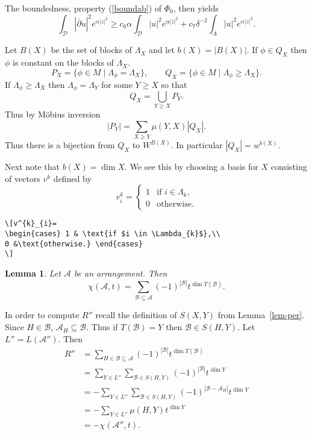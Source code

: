 \documentclass{article}
\newtheorem{lem}[thm]{Lemma}
\theoremstyle{definition}
\theoremstyle{remark}
\newcommand{\lemref}[1]{Lemma~\ref{#1}}
\newcommand{\A}{\mathcal{A}}
\newcommand{\B}{\mathcal{B}}
\newcommand{\envert}[1]{\left\lvert#1\right\rvert}
\let\abs=\envert
\begin{document}
The boundedness, property (\ref{boundab}) of $\Phi_ 0$, then yields
\[\int_{\mathcal{D}}\abs{\overline\partial u}^2e^{\alpha\abs{z}^2}\geq c_6\alpha
\int_{\mathcal{D}}\abs{u}^2e^{\alpha\abs{z}^2}
+c_7\delta^{-2}\int_ A\abs{u}^2e^{\alpha\abs{z}^2}.\]

Let $B(X)$ be the set of blocks of $\Lambda_{X}$
and let $b(X) = \abs{B(X)}$. If $\phi \in Q_{X}$ then
$\phi$ is constant on the blocks of $\Lambda_{X}$.
\begin{equation}\label{far-d}
 P_{X} = \{ \phi \in M \mid \Lambda_{\phi} = \Lambda_{X} \},
\qquad
Q_{X} = \{\phi \in M \mid \Lambda_{\phi} \geq \Lambda_{X} \}.
\end{equation}
If $\Lambda_{\phi} \geq \Lambda_{X}$ then
$\Lambda_{\phi} = \Lambda_{Y}$ for some $Y \geq X$ so that
\[ Q_{X} = \bigcup_{Y \geq X} P_{Y}. \]
Thus by M\"obius inversion
\[ \abs{P_{Y}}= \sum_{X\geq Y} \mu (Y,X)\abs{Q_{X}}.\]
Thus there is a bijection from $Q_{X}$ to $W^{B(X)}$.
In particular $\abs{Q_{X}} = w^{b(X)}$.

Next note that $b(X)=\dim X$. We see this by choosing a
basis for $X$ consisting of vectors $v^{k}$ defined by
\[v^{k}_{i}=
\begin{cases} 1 & \text{if $i \in \Lambda_{k}$},\\
0 &\text{otherwise.} \end{cases}
\]
\begin{verbatim}
\[v^{k}_{i}=
\begin{cases} 1 & \text{if $i \in \Lambda_{k}$},\\
0 &\text{otherwise.} \end{cases}
\]
\end{verbatim}

\begin{lem}\label{p0201}
Let $\A$ be an arrangement. Then
\[ \chi (\A,t) = \sum_{\B \subseteq \A}
(-1)^{\abs{\B}} t^{\dim T(\B)}. \]
\end{lem}

In order to compute $R''$ recall the definition
of $S(X,Y)$ from \lemref{lem-per}. Since $H \in \B$,
$\A_{H} \subseteq \B$. Thus if $T(\B) = Y$ then
$\B \in S(H,Y)$. Let $L'' = L(\A'')$. Then
\begin{equation}\label{E_SXgYy}
\begin{split}
R''&= \sum_{H\in \B \subseteq \A} (-1)^{\abs{\B}}
t^{\dim T(\B)}\\
&= \sum_{Y \in L''} \sum_{\B \in S(H,Y)}
(-1)^{\abs{\B}}t^{\dim Y} \\
&= -\sum_{Y \in L''} \sum_{\B \in S(H,Y)} (-1)^
{\abs{\B - \A_{H}}} t^{\dim Y} \\
&= -\sum_{Y \in L''} \mu (H,Y)t^{\dim Y} \\
&= -\chi (\A '',t).
\end{split}
\end{equation}
\end{document}
